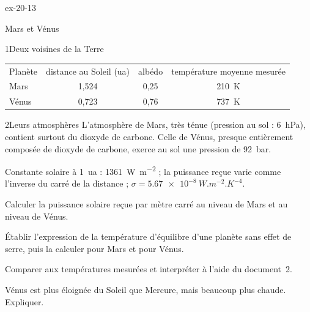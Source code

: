 \begin{blocLivre}{ex-20-13}
\begin{exercice}[3]{Mars et Vénus}
\begin{docu}{1}{Deux voisines de la Terre}
\begin{center}
\begin{tabular}{lccc}
\toprule
Planète & distance au Soleil (ua) & albédo & température moyenne mesurée \\
Mars & 1,524 & 0,25 & \qty{210}{K} \\
Vénus & 0,723 & 0,76 & \qty{737}{K} \\
\bottomrule
\end{tabular}
\end{center}
\end{docu}
\begin{docu}{2}{Leurs atmosphères}
L'atmosphère de Mars, très ténue (pression au sol : \qty{6}{hPa}), contient surtout du dioxyde de carbone. Celle de Vénus,
presque entièrement composée de dioxyde de carbone, exerce au sol une pression de \qty{92}{bar}.
\end{docu}
\begin{donnees}
Constante solaire à \qty{1}{ua} : \qty{1361}{W.m^{-2}} ; la puissance reçue varie comme l'inverse du carré de la distance ;
$\sigma=\qty{5,67e-8}{W.m^{-2}.K^{-4}}$.
\end{donnees}
\begin{questions}
\item Calculer la puissance solaire reçue par mètre carré au niveau de Mars et au niveau de Vénus.
\item Établir l'expression de la température d'équilibre d'une planète sans effet de serre, puis la calculer pour Mars et
pour Vénus.
\item \initiative Comparer aux températures mesurées et interpréter à l'aide du document~2.
\item Vénus est plus éloignée du Soleil que Mercure, mais beaucoup plus chaude. Expliquer.
\end{questions}
\end{exercice}
\end{blocLivre}
